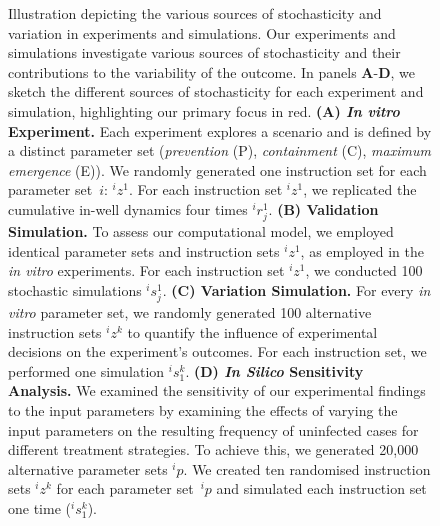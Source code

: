 \begin{figure}[p]
  \centering
  \caption{Illustration depicting the various sources of stochasticity and variation in experiments and simulations.
    Our experiments and simulations investigate various sources of stochasticity and their contributions to the variability of the outcome. In panels \textbf{A}-\textbf{D}, we sketch the different sources of stochasticity for each experiment and simulation, highlighting our primary focus in red.
    \textbf{(A) \textit{In vitro} Experiment.} Each experiment explores a scenario and is defined by a distinct parameter set (\textit{prevention} (P), \textit{containment} (C), \textit{maximum emergence} (E)). We randomly generated one instruction set for each parameter set~$i$: \ensuremath{{}^{i}\!z^{1}}. For each instruction set \ensuremath{{}^{i}\!z^{1}}, we replicated the cumulative in-well dynamics four times \ensuremath{{}^{i}\!r^{1}_{j}}.
    \textbf{(B) Validation Simulation.} To assess our computational model, we employed identical parameter sets and instruction sets \ensuremath{{}^{i}\!z^{1}}, as employed in the \textit{in vitro} experiments. For each instruction set \ensuremath{{}^{i}\!z^{1}}, we conducted 100 stochastic simulations \ensuremath{{}^{i}\!s^{1}_{j}}.
    \textbf{(C) Variation Simulation.} For every \textit{in vitro} parameter set, we randomly generated 100 alternative instruction sets \ensuremath{{}^{i}\!z^{k}} to quantify the influence of experimental decisions on the experiment's outcomes. For each instruction set, we performed one simulation \ensuremath{{}^{i}\!s^{k}_{1}}.
    \textbf{(D) \textit{In Silico} Sensitivity Analysis.}
  We examined the sensitivity of our experimental findings to the input parameters by examining the effects of varying the input parameters on the resulting frequency of uninfected cases for different treatment strategies. To achieve this, we generated 20{,}000 alternative parameter sets \ensuremath{{}^{i}\!p}. We created ten randomised instruction sets \ensuremath{{}^{i}\!z^{k}} for each parameter set~\ensuremath{{}^{i}\!p} and simulated each instruction set one time (\ensuremath{{}^{i}\!s^{k}_{1}}).}
  \label{fig:stochs}
\end{figure}

